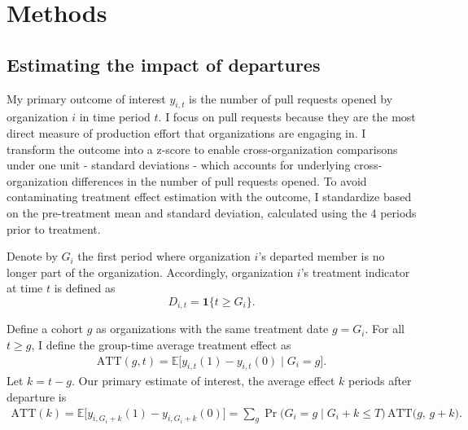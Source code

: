 \documentclass[12pt,notitlepage]{article}
\begin{document}
\section{Methods} \label{sec:method}
\subsection{Estimating the impact of departures} \label{sec:main_method}
My primary outcome of interest $y_{i,t}$ is the number of pull requests opened by organization $i$ in time period $t$. I focus on pull requests because they are the most direct measure of production effort that organizations are engaging in. I transform the outcome into a z-score to enable cross-organization comparisons under one unit - standard deviations - which accounts for underlying cross-organization differences in the number of pull requests opened. To avoid contaminating treatment effect estimation with the outcome, I standardize based on the pre-treatment mean and standard deviation, calculated using the 4 periods prior to treatment.

Denote by $G_i$ the first period where organization $i$'s departed member is no longer part of the organization. Accordingly, organization $i$'s treatment indicator at time $t$ is defined as
$$
D_{i,t} = \mathbf{1}\{t \ge G_i\}.
$$

Define a cohort $g$ as organizations with the same treatment date $g = G_i$. For all $t \geq g$, I define the group‐time average treatment effect as 
\begin{align*} \label{eq:group_time}
    \mathrm{ATT}(g,t) = \mathbb{E}\bigl [ y_{i,t}(1)-y_{i,t}(0)\mid G_i = g \bigr ].
\end{align*}
Let $k = t - g$. Our primary estimate of interest, the average effect \(k\) periods after departure is
\begin{align*} 
\mathrm{ATT}(k) =
\mathbb{E}\bigl[y_{i,G_i+k}(1)-y_{i,G_i+k}(0)\bigr] = 
\sum_{g} \Pr\!\bigl(G_i = g \mid G_i + k \le T\bigr)\,\mathrm{ATT}\bigl(g,\,g+k\bigr).
\end{align*} 
\end{document}
